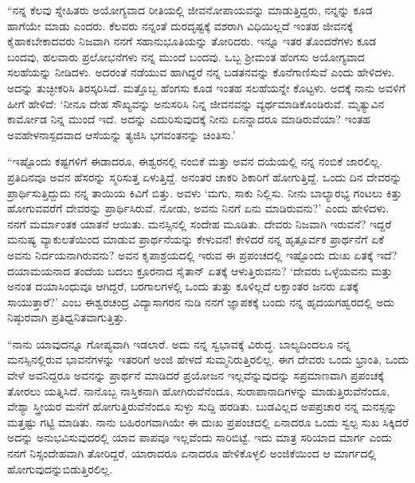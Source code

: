 “ನನ್ನ ಕೆಲವು ಸ್ನೇಹಿತರು ಅಯೋಗ್ಯವಾದ ರೀತಿಯಲ್ಲಿ ಜೀವನೋಪಾಯವನ್ನು ಮಾಡುತ್ತಿದ್ದರು, ನನ್ನನ್ನು ಕೂಡ ಹಾಗೆಯೇ ಮಾಡು ಎಂದರು. ಕೆಲವರು ನನ್ನಂತೆ ದುರದೃಷ್ಟಕ್ಕೆ ವಶರಾಗಿ ವಿಧಿಯಿಲ್ಲದೆ ಇಂತಹ ಜೀವನಕ್ಕೆ ಕೈಹಾಕಬೇಕಾದವರು ನಿಜವಾಗಿ ನನಗೆ ಸಹಾನುಭೂತಿಯನ್ನು ತೋರಿದರು. ಇನ್ನೂ ಇತರ ತೊಂದರೆಗಳು ಕೂಡ ಬಂದವು, ಹಲವಾರು ಪ್ರಲೋಭನೆಗಳು ನನ್ನ ಮುಂದೆ ಬಂದವು. ಒಬ್ಬ ಶ‍್ರೀಮಂತ ಹೆಂಗಸು ಅಯೋಗ್ಯವಾದ ಸಲಹೆಯನ್ನು ನೀಡಿದಳು. ಅದರಂತೆ ನಡೆಯುವ ಹಾಗಿದ್ದರೆ ನನ್ನ ಬಡತನವನ್ನು ಕೊನೆಗಾಣಿಸುವೆ ಎಂದು ಹೇಳಿದಳು. ಅದನ್ನು ತುಚ್ಛೀಕರಿಸಿ ತಿರಸ್ಕರಿಸಿದೆ. ಮತ್ತೊಬ್ಬ ಹೆಂಗಸು ಕೂಡ ಇಂತಹ ಸಲಹೆಯನ್ನೇ ಕೊಟ್ಟಳು. ಅದಕ್ಕೆ ನಾನು ಅವಳಿಗೆ ಹೀಗೆ ಹೇಳಿದೆ: ‘ನೀನೂ ದೇಹ ಸೌಖ್ಯವನ್ನು ಅನುಸರಿಸಿ ನಿನ್ನ ಜೀವನವನ್ನು ವ್ಯರ್ಥಮಾಡಿಕೊಂಡಿರುವೆ. ಮೃತ್ಯುವಿನ ಕಾರ್ಮೋಡ ನಿನ್ನ ಮುಂದೆ ಇದೆ. ಅದನ್ನು ಎದುರಿಸುವುದಕ್ಕೆ ನೀನು ಏನನ್ನಾದರೂ ಮಾಡಿರುವೆಯಾ? ಇಂತಹ ಅವಹೇಳನಾಸ್ಪದವಾದ ಆಸೆಯನ್ನು ತ್ಯಜಿಸಿ ಭಗವಂತನನ್ನು ಚಿಂತಿಸು.’

“ಇಷ್ಟೊಂದು ಕಷ್ಟಗಳಿಗೆ ಈಡಾದರೂ, ಈಶ್ವರನಲ್ಲಿ ನಂಬಿಕೆ ಮತ್ತು ಅವನ ದಯೆಯಲ್ಲಿ ನನ್ನ ನಂಬಿಕೆ ಜಾರಲಿಲ್ಲ. ಪ್ರತಿದಿನವೂ ಅವನ ಹೆಸರನ್ನು ಸ್ಮರಿಸುತ್ತ ಏಳುತ್ತಿದ್ದೆ. ಅನಂತರ ಚಾಕರಿ ಶಿಕಾರಿಗೆ ಹೋಗುತ್ತಿದ್ದೆ. ಒಂದು ದಿನ ದೇವರನ್ನು ಪ್ರಾರ್ಥಿಸುತ್ತಿದ್ದುದು ನನ್ನ ತಾಯಿಯ ಕಿವಿಗೆ ಬಿತ್ತು. ಅವಳು ‘ಮಗು, ಸಾಕು ನಿಲ್ಲಿಸು. ನೀನು ಬಾಲ್ಯಾರಭ್ಯ ಗಂಟಲು ಕಿತ್ತು ಹೋಗುವವರೆಗೆ ದೇವರನ್ನು ಪ್ರಾರ್ಥಿಸಿರುವೆ. ನೋಡು, ಅವನು ನಿನಗೆ ಏನು ಮಾಡಿರುವನು?’ ಎಂದು ಹೇಳಿದಳು. ನನಗೆ ಮರ್ಮಾಂತಕ ಯಾತನೆ ಆಯಿತು. ಮನಸ್ಸಿನಲ್ಲಿ ಸಂದೇಹ ಮೂಡಿತು. ದೇವರು ನಿಜವಾಗಿ ಇರುವನೆ? ಇದ್ದರೆ ಮನುಷ್ಯ ವ್ಯಾಕುಲತೆಯಿಂದ ಮಾಡುವ ಪ್ರಾರ್ಥನೆಯನ್ನು ಕೇಳುವನೆ! ಕೇಳಿದರೆ ನನ್ನ ಹೃತ್ಪೂರ್ವಕ ಪ್ರಾರ್ಥನೆಗೆ ಏಕೆ ಅವನು ನಿರ್ದಯನಾಗಿರುವನು? ಅವನ ಕೃಪಾಶ್ರಯದಲ್ಲಿ ಇರುವ ಈ ಪ್ರಪಂಚದಲ್ಲಿ ಇಷ್ಟೊಂದು ದುಃಖ ಏತಕ್ಕೆ ಇದೆ? ದಯಾಮಯನಾದ ತಂದೆಯ ಬದಲು ಕ್ರೂರನಾದ ಸೈತಾನ್ ಏತಕ್ಕೆ ಆಳುತ್ತಿರುವನು? ‘ದೇವರು ಒಳ್ಳೆಯವನು ಮತ್ತು ಅನಂತ ದಯಾಸಿಂಧುವೂ ಆಗಿದ್ದರೆ, ಬರಗಾಲಗಳಲ್ಲಿ ಒಂದು ತುತ್ತು ಕೂಳಿಲ್ಲದೆ ಲಕ್ಷಾಂತರ ಜನರು ಏತಕ್ಕೆ ಸಾಯುತ್ತಾರೆ?’ ಎಂಬ ಈಶ್ವರಚಂದ್ರ ವಿದ್ಯಾಸಾಗರನ ನುಡಿ ನನಗೆ ಜ್ಞಾಪಕಕ್ಕೆ ಬಂದು ನನ್ನ ಹೃದಯಗಹ್ವರದಲ್ಲಿ ಅದು ನಿಷ್ಠುರವಾಗಿ ಪ್ರತಿಧ್ವನಿತವಾಗುತ್ತಿತ್ತು.

“ನಾನು ಯಾವುದನ್ನೂ ಗೋಪ್ಯವಾಗಿ ಇಡಲಾರೆ. ಅದು ನನ್ನ ಸ್ವಭಾವಕ್ಕೆ ವಿರುದ್ಧ. ಬಾಲ್ಯದಿಂದಲೂ ನನ್ನ ಮನಸ್ಸಿನಲ್ಲಿರುವ ಭಾವನೆಗಳನ್ನು ಇತರರಿಗೆ ಅಂಜಿ ಹೇಳದೆ ಸುಮ್ಮನಿರುತ್ತಿರಲಿಲ್ಲ. ಈಗ ದೇವರು ಒಂದು ಭ್ರಾಂತಿ, ಒಂದು ವೇಳೆ ಅವನಿದ್ದರೂ ಅವನನ್ನು ಪ್ರಾರ್ಥನೆ ಮಾಡಿದರೆ ಪ್ರಯೋಜನ ಇಲ್ಲವೆನ್ನುವುದನ್ನು ಸಪ್ರಮಾಣವಾಗಿ ಪ್ರಪಂಚಕ್ಕೆ ತೋರಲು ಯತ್ನಿಸಿದೆ. ನಾನೊಬ್ಬ ನಾಸ್ತಿಕನಾಗಿ ಹೋಗಿರುವೆನೆಂದೂ, ಸುರಾಪಾನಾದಿಗಳನ್ನು ಮಾಡುತ್ತಿರುವೆನೆಂದೂ, ವೇಶ್ಯಾ ಸ್ತ್ರೀಯರ ಮನೆಗೆ ಹೋಗುತ್ತಿರುವೆನೆಂದೂ ಸುಳ್ಳು ಸುದ್ದಿ ಹರಡಿತು. ಬುಡವಿಲ್ಲದ ಅಪಪ್ರಚಾರ ನನ್ನ ಮನಸ್ಸನ್ನು ಮತ್ತಷ್ಟು ಗಟ್ಟಿ ಮಾಡಿತು. ನಾನು ಬಹಿರಂಗವಾಗಿಯೇ ಈ ದುಃಖ ಪ್ರಪಂಚದಲ್ಲಿ ಏನಾದರೂ ಒಂದು ಸ್ವಲ್ಪ ಸುಖ ಸಿಕ್ಕಿದರೆ ಅದನ್ನು ಅನುಭವಿಸುವುದರಲ್ಲಿ ಯಾವ ಪಾಪವೂ ಇಲ್ಲವೆಂದು ಸಾರಿಬಿಟ್ಟೆ. ಇದು ಮಾತ್ರ ಸರಿಯಾದ ಮಾರ್ಗ ಎಂದು ನನಗೆ ನಿಸ್ಸಂದೇಹವಾಗಿ ತೋರಿದ್ದರೆ, ಯಾರಾದರೂ ಏನಾದರೂ ಹೇಳಿಕೊಳ್ಳಲಿ ಅಂಜಿಕೆಯಿಂದ ಆ ಮಾರ್ಗದಲ್ಲಿ ಹೋಗುವುದನ್ನು\break ಬಿಡುತ್ತಿರಲಿಲ್ಲ.

